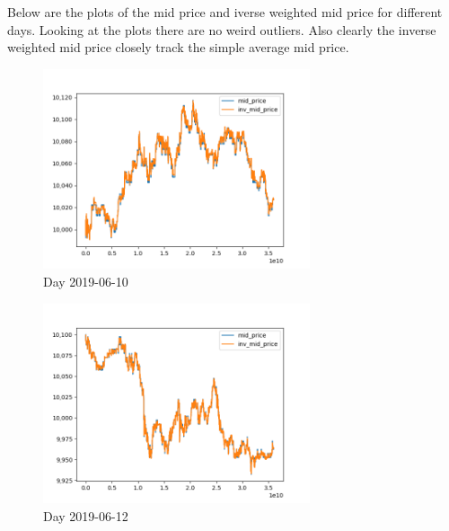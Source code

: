 \documentclass[english, 11pt, a4paper]{article}
\begin{document}
Below are the plots of the mid price and iverse weighted mid price for different days. Looking at
the plots there are no weird outliers. Also clearly the inverse weighted mid price closely track the
simple average mid price.
\begin{figure}[H] 
	\centering
	\includegraphics[width=0.70\textwidth]{../data/figures/time_series_20190610_mid_price_inv_mid_price.png}
	\caption{Day 2019-06-10}
	\label{fig2}
\end{figure}

\begin{figure}[H] 
	\centering
	\includegraphics[width=0.70\textwidth]{../data/figures/time_series_20190612_mid_price_inv_mid_price.png}
	\caption{Day 2019-06-12}
	\label{fig3}
\end{figure}


\end{document}
